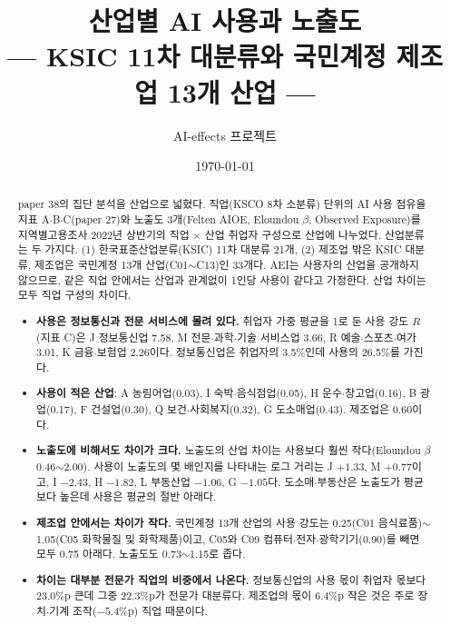 \documentclass[11pt]{article}
\title{산업별 AI 사용과 노출도\\[2mm]
\large --- KSIC 11차 대분류와 국민계정 제조업 13개 산업 ---}
\author{AI-effects 프로젝트}
\date{\today}
\begin{document}
\maketitle

\begin{abstract}
\noindent paper 38의 집단 분석을 산업으로 넓혔다. 직업(KSCO 8차 소분류) 단위의 AI 사용 점유율 지표 A$\cdot$B$\cdot$C(paper 27)와 노출도 3개(Felten AIOE\parencite{felten-2023-how-will-language-modelers-like-chatgpt}, Eloundou $\beta$\parencite{eloundou-2023-gpts-are-gpts-an-early}, Observed Exposure\parencite{massenkoff-2026-labor-market-impacts-of-ai})를 지역별고용조사 2022년 상반기의 직업 $\times$ 산업 취업자 구성으로 산업에 나누었다. 산업분류는 두 가지다. (1) 한국표준산업분류(KSIC) 11차 대분류 21개, (2) 제조업 밖은 KSIC 대분류, 제조업은 국민계정 13개 산업(C01$\sim$C13)인 33개다. AEI는 사용자의 산업을 공개하지 않으므로, 같은 직업 안에서는 산업과 관계없이 1인당 사용이 같다고 가정한다. 산업 차이는 모두 직업 구성의 차이다.
\begin{itemize}[leftmargin=*]
  \item \textbf{사용은 정보통신과 전문 서비스에 몰려 있다.} 취업자 가중 평균을 1로 둔 사용 강도 $R$(지표 C)은 J 정보통신업 7.58, M 전문$\cdot$과학$\cdot$기술 서비스업 3.66, R 예술$\cdot$스포츠$\cdot$여가 3.01, K 금융$\cdot$보험업 2.26이다. 정보통신업은 취업자의 3.5\%인데 사용의 26.5\%를 가진다.
  \item \textbf{사용이 적은 산업}: A 농림어업(0.03), I 숙박$\cdot$음식점업(0.05), H 운수$\cdot$창고업(0.16), B 광업(0.17), F 건설업(0.30), Q 보건$\cdot$사회복지(0.32), G 도소매업(0.43). 제조업은 0.60이다.
  \item \textbf{노출도에 비해서도 차이가 크다.} 노출도의 산업 차이는 사용보다 훨씬 작다(Eloundou $\beta$ 0.46$\sim$2.00). 사용이 노출도의 몇 배인지를 나타내는 로그 거리는 J $+1.33$, M $+0.77$이고, I $-2.43$, H $-1.82$, L 부동산업 $-1.06$, G $-1.05$다. 도소매$\cdot$부동산은 노출도가 평균보다 높은데 사용은 평균의 절반 아래다.
  \item \textbf{제조업 안에서는 차이가 작다.} 국민계정 13개 산업의 사용 강도는 0.25(C01 음식료품)$\sim$1.05(C05 화학물질 및 화학제품)이고, C05와 C09 컴퓨터$\cdot$전자$\cdot$광학기기(0.90)를 빼면 모두 0.75 아래다. 노출도도 0.73$\sim$1.15로 좁다.
  \item \textbf{차이는 대부분 전문가 직업의 비중에서 나온다.} 정보통신업의 사용 몫이 취업자 몫보다 23.0\%p 큰데 그중 22.3\%p가 전문가 대분류다. 제조업의 몫이 6.4\%p 작은 것은 주로 장치$\cdot$기계 조작($-5.4$\%p) 직업 때문이다.
\end{itemize}
\end{abstract}
\end{document}
